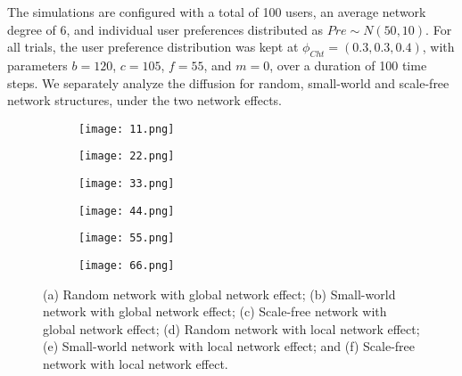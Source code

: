 \documentclass{article} %
\begin{document}
The simulations are configured with a total of 100 users, an average network degree of 6, and individual user preferences distributed as \( Pre \sim N(50, 10) \). For all trials, the user preference distribution was kept at \( \phi_{Cht} = (0.3, 0.3, 0.4) \), with parameters \( b = 120 \), \( c = 105 \), \( f = 55 \), and \( m = 0 \), over a duration of 100 time steps. We separately analyze the diffusion for random, small-world and scale-free network structures, under the two network effects.
\begin{figure}[h]
    \centering
    \begin{subfigure}{0.3\textwidth}
        \centering
        \texttt{[image: 11.png]} %
        \caption{}
        \label{fig:subfig_a}
    \end{subfigure}
    \hspace{0.02\textwidth} %
    \begin{subfigure}{0.3\textwidth}
        \centering
        \texttt{[image: 22.png]} %
        \caption{}
        \label{fig:subfig_b}
    \end{subfigure}
    \hspace{0.02\textwidth} %
    \begin{subfigure}{0.3\textwidth}
        \centering
        \texttt{[image: 33.png]} %
        \caption{}
        \label{fig:subfig_c}
    \end{subfigure}
    
    \vspace{0.5cm} %
    \begin{subfigure}{0.3\textwidth}
        \centering
        \texttt{[image: 44.png]} %
        \caption{}
        \label{fig:subfig_d}
    \end{subfigure}
    \hspace{0.02\textwidth} %
    \begin{subfigure}{0.3\textwidth}
        \centering
        \texttt{[image: 55.png]} %
        \caption{}
        \label{fig:subfig_e}
    \end{subfigure}
    \hspace{0.02\textwidth} %
    \begin{subfigure}{0.3\textwidth}
        \centering
        \texttt{[image: 66.png]} %
        \caption{}
        \label{fig:subfig_f}
    \end{subfigure}
    
    \caption{(a) Random network with global network effect; (b) Small-world network with global network effect; (c) Scale-free network with global network effect; (d) Random network with local network effect; (e) Small-world network with local network effect; and (f) Scale-free network with local network effect.}
    \label{fig:network_dynamics}
\end{figure}
\end{document}
